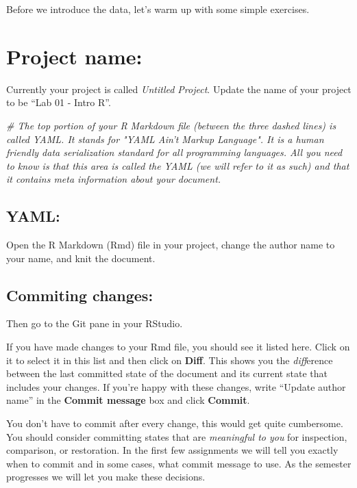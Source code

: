 \documentclass[]{book}
\newenvironment{Shaded}{\begin{snugshade}}{\end{snugshade}}
\newcommand{\CommentTok}[1]{\textcolor[rgb]{0.56,0.35,0.01}{\textit{#1}}}
\begin{document}
Before we introduce the data, let's warm up with some simple exercises.

\section{Project name:}\label{project-name}

Currently your project is called \emph{Untitled Project}. Update the
name of your project to be ``Lab 01 - Intro R''.

\begin{Shaded}
\begin{Highlighting}[]
\CommentTok{# The top portion of your R Markdown file (between the three dashed lines) is called YAML. It stands for "YAML Ain't Markup Language". It is a human friendly data serialization standard for all programming languages. All you need to know is that this area is called the YAML (we will refer to it as such) and that it contains meta information about your document.}
\end{Highlighting}
\end{Shaded}

\subsection{YAML:}\label{yaml}

Open the R Markdown (Rmd) file in your project, change the author name
to your name, and knit the document.

\subsection{Commiting changes:}\label{commiting-changes}

Then go to the Git pane in your RStudio.

If you have made changes to your Rmd file, you should see it listed
here. Click on it to select it in this list and then click on
\textbf{Diff}. This shows you the \emph{diff}erence between the last
committed state of the document and its current state that includes your
changes. If you're happy with these changes, write ``Update author
name'' in the \textbf{Commit message} box and click \textbf{Commit}.

You don't have to commit after every change, this would get quite
cumbersome. You should consider committing states that are
\emph{meaningful to you} for inspection, comparison, or restoration. In
the first few assignments we will tell you exactly when to commit and in
some cases, what commit message to use. As the semester progresses we
will let you make these decisions.
\end{document}
